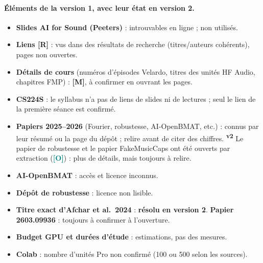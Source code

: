 \documentclass[11pt,a4paper]{article}
\newcommand{\vtwo}{\textsuperscript{\textcolor{orange!80!black}{\textbf{v2}}}}
\newcommand{\lO}{\textbf{\textcolor{teal}{[O]}}}
\newcommand{\lR}{\textbf{\textcolor{orange!80!black}{[R]}}}
\newcommand{\lM}{\textbf{\textcolor{red!70!black}{[M]}}}
\begin{document}
\paragraph{Éléments de la version 1, avec leur état en version 2.}
\begin{itemize}
\item \textbf{Slides AI for Sound (Peeters)} : introuvables en ligne ; non utilisés.
\item \textbf{Liens \lR} : vus dans des résultats de recherche (titres/auteurs cohérents), pages non ouvertes.
\item \textbf{Détails de cours} (numéros d'épisodes Velardo, titres des unités HF Audio, chapitres FMP) : \lM, à confirmer en ouvrant les pages.
\item \textbf{CS224S} : le syllabus n'a pas de liens de slides ni de lectures ; seul le lien de la première séance est confirmé.
\item \textbf{Papiers 2025--2026} (Fourier, robustesse, AI-OpenBMAT, etc.) : connus par leur résumé ou la page du dépôt ; relire avant de citer des chiffres. \vtwo{} Le papier de robustesse et le papier FakeMusicCaps ont été ouverts par extraction (\lO) : plus de détails, mais toujours à relire.
\item \textbf{AI-OpenBMAT} : accès et licence inconnus.
\item \textbf{Dépôt de robustesse} : licence non lisible.
\item \textbf{Titre exact d'Afchar et al.\ 2024} : \textbf{résolu en version 2}. \textbf{Papier 2603.09936} : toujours à confirmer à l'ouverture.
\item \textbf{Budget GPU et durées d'étude} : estimations, pas des mesures.
\item \textbf{Colab} : nombre d'unités Pro non confirmé (100 ou 500 selon les sources).
\end{itemize}
\end{document}
